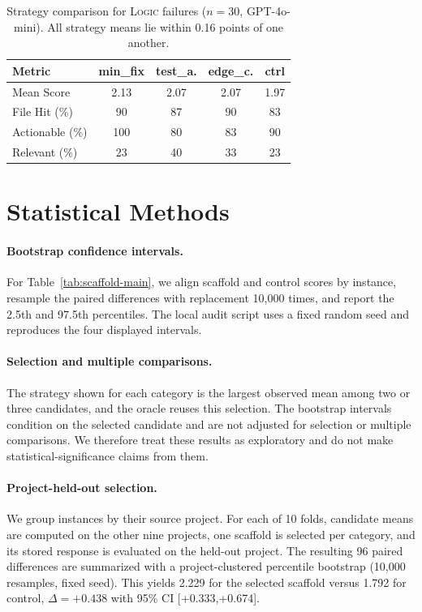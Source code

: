 \documentclass{article}
\begin{document}
\begin{table}[H]
\centering
\small
\setlength{\tabcolsep}{3pt}
\begin{tabular}{@{}lcccc@{}}
\toprule
\textbf{Metric} & \textbf{min\_fix} & \textbf{test\_a.} & \textbf{edge\_c.} & \textbf{ctrl} \\
\midrule
Mean Score & 2.13 & 2.07 & 2.07 & 1.97 \\
File Hit (\%) & 90 & 87 & 90 & 83 \\
Actionable (\%) & 100 & 80 & 83 & 90 \\
Relevant (\%) & 23 & 40 & 33 & 23 \\
\bottomrule
\end{tabular}
\caption{Strategy comparison for \textsc{Logic} failures ($n=30$,
GPT-4o-mini). All strategy means lie within 0.16 points of one another.}
\label{tab:per-instance-logic}
\end{table}


\section{Statistical Methods}
\label{app:stats}

\paragraph{Bootstrap confidence intervals.}
For Table~\ref{tab:scaffold-main}, we align scaffold and control scores by
instance, resample the paired differences with replacement 10,000 times, and
report the 2.5th and 97.5th percentiles.  The local audit script uses a fixed
random seed and reproduces the four displayed intervals.

\paragraph{Selection and multiple comparisons.}
The strategy shown for each category is the largest observed mean among two or
three candidates, and the oracle reuses this selection.  The bootstrap intervals
condition on the selected candidate and are not adjusted for selection or
multiple comparisons.  We therefore treat these results as exploratory and do
not make statistical-significance claims from them.

\paragraph{Project-held-out selection.}
We group instances by their source project.  For each of 10 folds, candidate
means are computed on the other nine projects, one scaffold is selected per
category, and its stored response is evaluated on the held-out project.  The
resulting 96 paired differences are summarized with a project-clustered
percentile bootstrap (10,000 resamples, fixed seed).  This yields 2.229 for the
selected scaffold versus 1.792 for control, $\Delta=+0.438$ with 95\% CI
[+0.333,+0.674].
\end{document}
